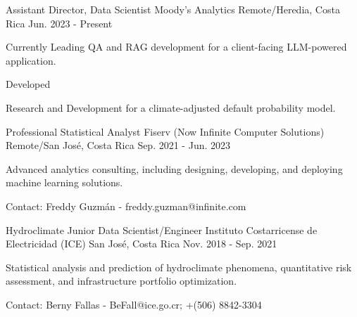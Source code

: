 
\begin{cventries}

  \cventry
    {Assistant Director, Data Scientist} %
    {Moody's Analytics} %
    {Remote/Heredia, Costa Rica} %
    {Jun. 2023 - Present} %
    {
      \begin{cvitems} %
        \item {Currently Leading QA and RAG development for a client-facing LLM-powered application.}
        \item {Developed }
        \item {Research and Development for a climate-adjusted default probability model.}
      \end{cvitems}
    }

  \cventry
    {Professional Statistical Analyst} %
    {Fiserv (Now Infinite Computer Solutions)} %
    {Remote/San José, Costa Rica} %
    {Sep. 2021 - Jun. 2023} %
    {
      \begin{cvitems} %
        \item {Advanced analytics consulting, including designing, developing, and deploying machine learning solutions.}
        \item {Contact: Freddy Guzmán - freddy.guzman@infinite.com}
      \end{cvitems}
    }

  \cventry
    {Hydroclimate Junior Data Scientist/Engineer} %
    {Instituto Costarricense de Electricidad (ICE)} %
    {San José, Costa Rica} %
    {Nov. 2018 - Sep. 2021} %
    {
      \begin{cvitems} %
        \item {Statistical analysis and prediction of hydroclimate phenomena, quantitative risk assessment, and infrastructure portfolio optimization.}
        \item {Contact: Berny Fallas - BeFall@ice.go.cr; +(506) 8842-3304}
      \end{cvitems}
    }


\end{cventries}

